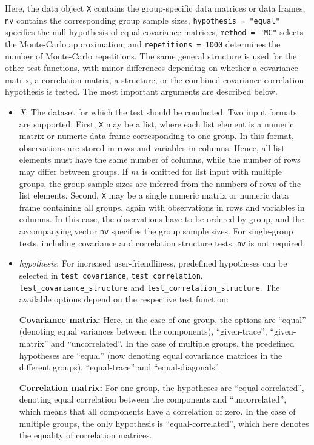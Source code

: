 Here, the data object \texttt{X} contains the group-specific data matrices or data
frames, \texttt{nv} contains the corresponding group sample sizes,
\texttt{hypothesis\ =\ "equal"} specifies the null hypothesis of equal covariance
matrices, \texttt{method\ =\ "MC"} selects the Monte-Carlo approximation, and
\texttt{repetitions\ =\ 1000} determines the number of Monte-Carlo repetitions. The same
general structure is used for the other test functions, with minor differences
depending on whether a covariance matrix, a correlation matrix, a structure, or
the combined covariance-correlation hypothesis is tested. The most important
arguments are described below.

\begin{itemize}
\item
  \emph{X}: The dataset for which the test should be conducted. Two input
  formats are supported. First, \texttt{X} may be a list, where each list element is
  a numeric matrix or numeric data frame corresponding to one group. In this
  format, observations are stored in rows and variables in columns. Hence,
  all list elements must have the same number of columns, while the number of
  rows may differ between groups. If \emph{nv} is omitted for list input with
  multiple groups, the group sample sizes are inferred from the numbers of
  rows of the list elements. Second, \texttt{X} may be a single numeric matrix or
  numeric data frame containing all groups, again with observations in rows
  and variables in columns. In this case, the observations have to be ordered
  by group, and the accompanying vector \texttt{nv} specifies the group sample sizes.
  For single-group tests, including covariance and correlation structure
  tests, \texttt{nv} is not required.
\item
  \emph{hypothesis}: For increased user-friendliness, predefined hypotheses can be selected in
  \texttt{test\_covariance}, \texttt{test\_correlation}, \texttt{test\_covariance\_structure} and
  \texttt{test\_correlation\_structure}. The available options depend on the
  respective test function:

  \textbf{Covariance matrix:} Here, in the case of one group,
  the options are ``equal'' (denoting equal variances between the components),
  ``given-trace'', ``given-matrix'' and ``uncorrelated''.
  In the case of multiple groups, the predefined hypotheses are
  ``equal'' (now denoting equal covariance matrices in the different
  groups), ``equal-trace'' and ``equal-diagonals''.

  \textbf{Correlation matrix:} For one group, the hypotheses
  are ``equal-correlated'', denoting equal correlation between the
  components and ``uncorrelated'', which means that all components
  have a correlation of zero. In the case of multiple groups, the
  only hypothesis is ``equal-correlated'', which here denotes the
  equality of correlation matrices.


\end{itemize}
